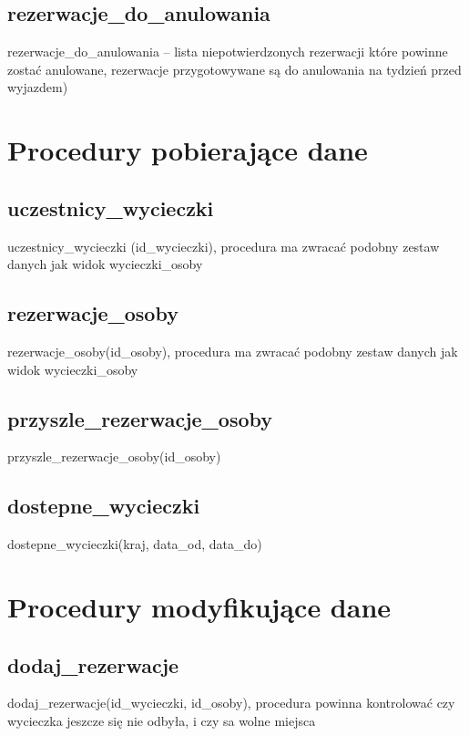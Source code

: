 \documentclass[12pt]{article}
\begin{document}
\subsection{rezerwacje\_do\_anulowania}
rezerwacje\_do\_anulowania – lista niepotwierdzonych rezerwacji które powinne zostać
anulowane, rezerwacje przygotowywane są do anulowania na tydzień przed wyjazdem)


\section{Procedury pobierające dane}

\subsection{uczestnicy\_wycieczki}
uczestnicy\_wycieczki (id\_wycieczki), procedura ma zwracać podobny zestaw danych jak widok wycieczki\_osoby


\subsection{rezerwacje\_osoby}
rezerwacje\_osoby(id\_osoby), procedura ma zwracać podobny zestaw danych jak widok wycieczki\_osoby


\subsection{przyszle\_rezerwacje\_osoby}
przyszle\_rezerwacje\_osoby(id\_osoby)


\subsection{dostepne\_wycieczki}
dostepne\_wycieczki(kraj, data\_od, data\_do)


\section{Procedury modyfikujące dane}
\subsection{dodaj\_rezerwacje}
dodaj\_rezerwacje(id\_wycieczki, id\_osoby), procedura powinna kontrolować czy wycieczka
jeszcze się nie odbyła, i czy sa wolne miejsca

\end{document}
